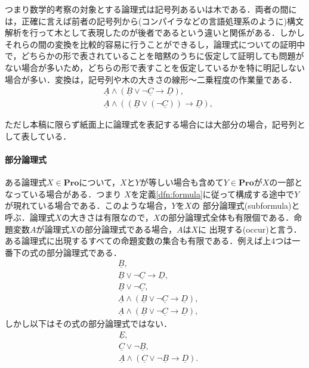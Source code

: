 \documentclass{ltjsarticle}
\theoremstyle{mystyle1}
\theoremstyle{mystyle3}
\theoremstyle{mystyle2}
\newcommand{\uA}{\underline{A}}
\newcommand{\uB}{\underline{B}}
\newcommand{\uC}{\underline{C}}
\newcommand{\uD}{\underline{D}}
\newcommand{\uE}{\underline{E}}
\newcommand{\bPro}{\ensuremath{\mathbf{Pro}}}
\newcommand{\red}[1]{{\color{red} #1}}
\begin{document}
つまり数学的考察の対象とする論理式は記号列あるいは木である．両者の間には，正確に言えば前者の記号列から(コンパイラなどの言語処理系のように)構文解析を行って木として表現したのが後者であるという違いと関係がある．しかしそれらの間の変換を比較的容易に行うことができるし，論理式についての証明中で，どちらかの形で表されていることを暗黙のうちに仮定して証明しても問題がない場合が多いため，どちらの形で表すことを仮定しているかを特に明記しない場合が多い．変換は，記号列や木の大きさの線形～二乗程度の作業量である．
\begin{align}
   & \uA\wedge\left(\uB\vee\neg\uC\to\uD\right),                           \\
   & \uA\wedge\left(\left(\uB\vee\left(\neg\uC\right)\right)\to\uD\right),
\end{align}
\begin{center}
\end{center}


ただし本稿に限らず紙面上に論理式を表記する場合には大部分の場合，記号列として表している．
\paragraph{部分論理式}
ある論理式$X\in \bPro$について，$X$と$Y$が等しい場合も含めて$Y\in\bPro$が$X$の一部となっている場合がある．つまり $X$を定義\ref{dfn:formula}に従って構成する途中で$Y$が現れている場合である．このような場合，$Y$を$X$の\red{部分論理式}(subformula)と呼ぶ．論理式$X$の大きさは有限なので，$X$の部分論理式全体も有限個である．命題変数$A$が論理式$X$の部分論理式である場合，$A$は$X$に\red{出現する}(occur)と言う．ある論理式に出現するすべての命題変数の集合も有限である．例えば上4つは一番下の式の部分論理式である．
\begin{align}
   & \uB,                                        \\
   & \uB\vee\neg\uC\to\uD,                       \\
   & \uB\vee\neg\uC,                             \\
   & \uA\wedge\left(\uB\vee\neg\uC\to\uD\right), \\
   & \uA\wedge\left(\uB\vee\neg\uC\to\uD\right),
\end{align}
しかし以下はその式の部分論理式ではない．
\begin{align}
   & \uE,                                        \\
   & \uC\vee\neg\uB,                             \\
   & \uA\wedge\left(\uC\vee\neg\uB\to\uD\right).
\end{align}
\end{document}
